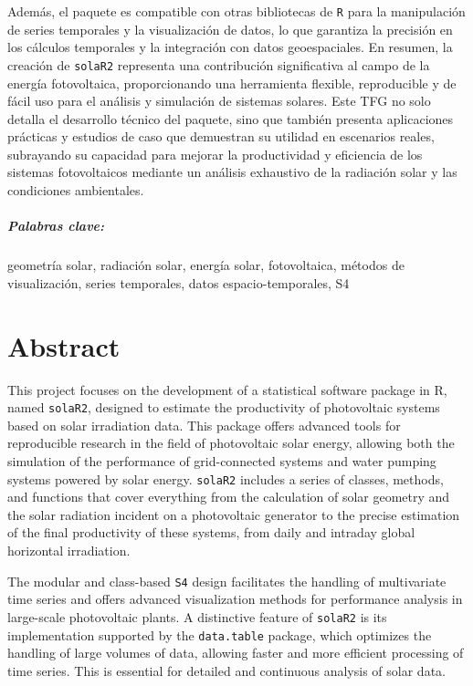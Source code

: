 Además, el paquete es compatible con otras bibliotecas de \texttt{R} para la manipulación de series temporales y la visualización de datos, lo que garantiza la precisión en los cálculos temporales y la integración con datos geoespaciales. En resumen, la creación de \texttt{solaR2} representa una contribución significativa al campo de la energía fotovoltaica, proporcionando una herramienta flexible, reproducible y de fácil uso para el análisis y simulación de sistemas solares. Este TFG no solo detalla el desarrollo técnico del paquete, sino que también presenta aplicaciones prácticas y estudios de caso que demuestran su utilidad en escenarios reales, subrayando su capacidad para mejorar la productividad y eficiencia de los sistemas fotovoltaicos mediante un análisis exhaustivo de la radiación solar y las condiciones ambientales.

\paragraph{Palabras clave:}
geometría solar, radiación solar, energía solar, fotovoltaica, métodos de visualización, series temporales, datos espacio-temporales, S4

\chapter*{Abstract}
This project focuses on the development of a statistical software package in R, named \texttt{solaR2}, designed to estimate the productivity of photovoltaic systems based on solar irradiation data. This package offers advanced tools for reproducible research in the field of photovoltaic solar energy, allowing both the simulation of the performance of grid-connected systems and water pumping systems powered by solar energy. \texttt{solaR2} includes a series of classes, methods, and functions that cover everything from the calculation of solar geometry and the solar radiation incident on a photovoltaic generator to the precise estimation of the final productivity of these systems, from daily and intraday global horizontal irradiation.

The modular and class-based \texttt{S4} design facilitates the handling of multivariate time series and offers advanced visualization methods for performance analysis in large-scale photovoltaic plants. A distinctive feature of \texttt{solaR2} is its implementation supported by the \texttt{data.table} package, which optimizes the handling of large volumes of data, allowing faster and more efficient processing of time series. This is essential for detailed and continuous analysis of solar data.

